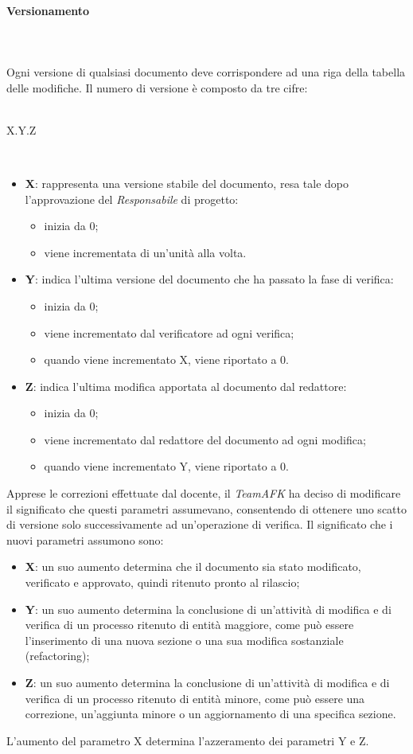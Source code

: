 \paragraph{Versionamento}\mbox{} \\ \mbox{} \\
Ogni versione di qualsiasi documento deve corrispondere ad una riga della tabella delle modifiche. Il numero di versione è composto da tre cifre: \\ \\
\centerline{X.Y.Z} \\
\begin{itemize}
\item \textbf{X}: rappresenta una versione stabile del documento, resa tale dopo l'approvazione del \textit{Responsabile} di progetto: \begin{itemize}
\item inizia da 0; 
\item viene incrementata di un'unità alla volta.
\end{itemize}
\item \textbf{Y}: indica l'ultima versione del documento che ha passato la fase di verifica: \begin{itemize}
\item inizia da 0;
\item viene incrementato dal verificatore ad ogni verifica;
\item quando viene incrementato X, viene riportato a 0.
\end{itemize} 
\item \textbf{Z}: indica l'ultima modifica apportata al documento dal redattore: \begin{itemize}
\item inizia da 0;
\item viene incrementato dal redattore del documento ad ogni modifica;
\item quando viene incrementato Y, viene riportato a 0.
\end{itemize}
\end{itemize}
Apprese le correzioni effettuate dal docente, il \textit{TeamAFK} ha deciso di modificare il significato che questi parametri assumevano, consentendo di ottenere uno scatto di versione solo successivamente ad un'operazione di verifica. Il significato che i nuovi parametri assumono sono:
\begin{itemize}
    \item \textbf{X}: un suo aumento determina che il documento sia stato modificato, verificato e approvato, quindi ritenuto pronto al rilascio;
    \item \textbf{Y}: un suo aumento determina la conclusione di un'attività di modifica e di verifica di un processo ritenuto di entità maggiore, come può essere l'inserimento di una nuova sezione o una sua modifica sostanziale (refactoring);
    \item \textbf{Z}: un suo aumento determina la conclusione di un'attività di modifica e di verifica di un processo ritenuto di entità minore, come può essere una correzione, un'aggiunta minore o un aggiornamento di una specifica sezione.
\end{itemize}
L'aumento del parametro X determina l'azzeramento dei parametri Y e Z.


